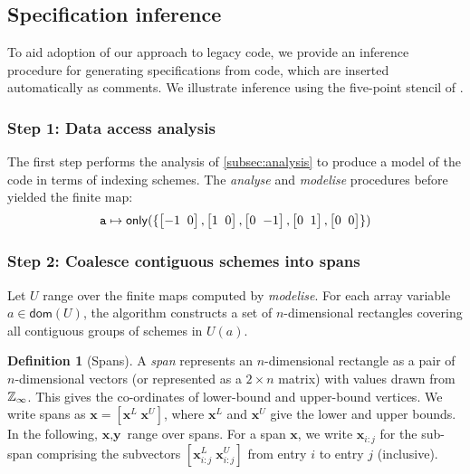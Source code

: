 \documentclass[10pt,preprint,numbers]{sigplanconf}
\newcounter{block}
\theoremstyle{definition}
\newtheorem{definition}[block]{Definition}
\newcommand{\vect}[1]{\textbf{#1}}
\newcommand{\vtwoh}[2]{\setlength{\arraycolsep}{0em}
\left[\begin{array}{cc}#1 \; & \; #2\end{array}\right]}
\begin{document}
\subsection{Specification inference}
\label{subsec:inference}

To aid adoption of our approach to legacy code, we provide
an inference procedure for generating specifications from code, which
are inserted automatically as comments.
We illustrate inference using the
 five-point stencil of
 .

\subsubsection{Step 1: Data access analysis}
\label{sec:inf-step1}

The first step performs the
analysis of \cref{subsec:analysis} to produce a
model of the code in terms of indexing schemes.
The \emph{analyse} and \emph{modelise} procedures before yielded the finite map:
%
\begin{align*}
\texttt{a} \mapsto \mathsf{only}(\{\vtwoh{-1}{0}, \vtwoh{1}{0},
          \vtwoh{0}{-1}, \vtwoh{0}{1}, \vtwoh{0}{0}\})
\end{align*}
%

\subsubsection{Step 2: Coalesce contiguous schemes into spans}
\label{sec:inf-step3}

Let $U$ range over the finite maps computed by \textit{modelise}.  For
each array variable $a \in \mathsf{dom}(U)$, the algorithm constructs a set of
$n$-dimensional rectangles covering all contiguous groups of schemes
in $U(a)$.

\newcommand{\spanOp}{\textsf{spans}}

\begin{definition}[Spans]
  A \emph{span} represents an $n$-dimensional rectangle
  as a pair of $n$-dimensional vectors (or
  represented as a $2 \times n$ matrix) with values drawn from
  $\mathbb{Z}_\infty{}$. This gives the co-ordinates of lower-bound 
  and upper-bound vertices. We write
  spans as $\vect{x} = [\vect{x}^L \; \vect{x}^U]$, where $\vect{x}^L$
  and $\vect{x}^U$ give the lower and upper bounds.  In
  the following, $\vect{x}, \vect{y}$ range over spans.  For a span
  $\vect{x}$, we write $\vect{x}_{i:j}$ for the sub-span comprising the
  subvectors $[\vect{x}^L_{i:j} \; \vect{x}^U_{i:j}]$ from entry $i$
  to entry $j$ (inclusive).
\end{definition}
\end{document}
